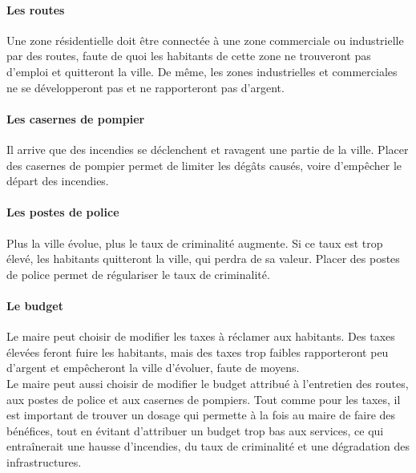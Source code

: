 \paragraph{Les routes}
Une zone résidentielle doit être connectée à une zone commerciale ou industrielle par des routes, faute de quoi les habitants de cette zone ne trouveront pas d'emploi et quitteront la ville. De même, les zones industrielles et commerciales ne se développeront pas et ne rapporteront pas d'argent.
\paragraph{Les casernes de pompier}
Il arrive que des incendies se déclenchent et ravagent une partie de la ville. Placer des casernes de pompier permet de limiter les dégâts causés, voire d'empêcher le départ des incendies.
\paragraph{Les postes de police}
Plus la ville évolue, plus le taux de criminalité augmente. Si ce taux est trop élevé, les habitants quitteront la ville, qui perdra de sa valeur. Placer des postes de police permet de régulariser le taux de criminalité.
\paragraph{Le budget}
Le maire peut choisir de modifier les taxes à réclamer aux habitants. Des taxes élevées feront fuire les habitants, mais des taxes trop faibles rapporteront peu d'argent et empêcheront la ville d'évoluer, faute de moyens.\\
Le maire peut aussi choisir de modifier le budget attribué à l'entretien des routes, aux postes de police et aux casernes de pompiers. Tout comme pour les taxes, il est important de trouver un dosage qui permette à la fois au maire de faire des bénéfices, tout en évitant d'attribuer un budget trop bas aux services, ce qui entraînerait une hausse d'incendies, du taux de criminalité et une dégradation des infrastructures.


